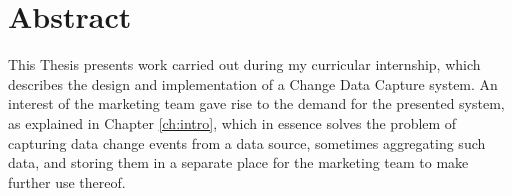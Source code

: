 \chapter*{Abstract} %
\label{ch:abstract}


%


%
%
%


This Thesis presents work carried out during my curricular internship, which describes the design and implementation of a Change Data Capture system.
An interest of the marketing team gave rise to the demand for the presented system, as explained in Chapter \ref{ch:intro}, which in essence solves the problem of capturing data change events from a data source, sometimes aggregating such data, and storing them in a separate place for the marketing team to make further use thereof.

